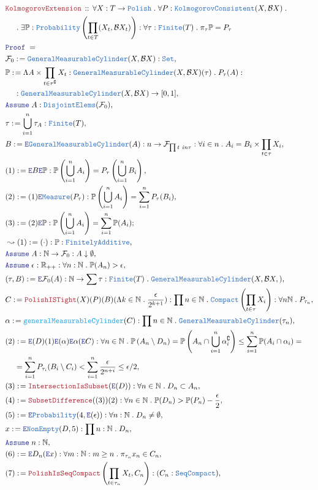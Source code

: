 \documentclass[12pt]{scrartcl}
\newcommand{\TYPE}[1]{\textcolor{NavyBlue}{\mathtt{#1}}}
\newcommand{\FUNC}[1]{\textcolor{Cerulean}{\mathtt{#1}}}
\newcommand{\LOGIC}[1]{\textcolor{Blue}{\mathtt{#1}}}
\newcommand{\THM}[1]{\textcolor{Maroon}{\mathtt{#1}}}
\renewcommand{\.}{\; . \;}
\newcommand{\de}{: \kern 0.1pc =}
\newcommand{\Theorem}[2]{& \THM{#1} \, :: \, #2 \\ & \Proof = \\ }
\newcommand{\NewLine}{\\ & \kern 1pc}
\newcommand{\Page}[1]{ \begin{align*} #1 \end{align*}   }
\newcommand{\ForEach}[3]{\forall #1 : #2 \. #3 }
\newcommand{\Reals}{\mathbb{R} }
\newcommand{\Nat}{\mathbb{N} }
\newcommand{\Set}{\TYPE{Set}}
\renewcommand{\c}{\complement}
\newcommand{\Say}[3]{& #1 \de #2 : #3, \\}
\newcommand{\Conclude}[3]{& #1 \de #2 : #3; \\}
\newcommand{\Derive}[3]{& \leadsto #1 \de #2 : #3, \\}
\newcommand{\Assume}[2]{& \LOGIC{Assume} \; #1 : #2, \\}
\newcommand{\ByDef}{\LOGIC{E}}
\newcommand{\Proof}{\LOGIC{Proof} \; }
\newcommand{\B}{\mathcal{B}}
\newcommand{\F}{\mathcal{F}}
\begin{document}
\Page{
\Theorem{ KolmogorovExtension }{ 
\ForEach{X}{T \to \TYPE{Polish}}{
\ForEach{P}{ \TYPE{KolmogorovConsistent}(X, \B X ) }{ \NewLine \. 
\exists \mathbb{P} :\TYPE{Probability}\left( \prod_{ t \in T}  (X_t, \B X_t)  \right)
 : 
\ForEach{\tau}{\TYPE{Finite}(T)}{ 
 \pi_\tau \mathbb{P} = P_\tau
}}}}
\Say{ \F_0 }{  \TYPE{GeneralMeasurableCylinder}(X, \B X)  }{\Set}
\Say{ \mathbb{P}}{ \Lambda A \times \prod_{t \in \tau^\c } X_t : \TYPE{GeneralMeasurableCylinder}(X, \B X)(\tau) \. P_\tau(A)  }{ \NewLine :
\TYPE{ GeneralMeasurableCylinder}(X, \B X) \to [0,1] }
\Assume{A}{\TYPE{DisjointElems}(\F_0)}
\Say{\tau}{ \bigcup^n_{i = 1} \tau_A }{ \TYPE{Finite}(T) }
\Say{ B }{ \ByDef\TYPE{GeneralMeasurableCylinder}(A) }{ n \to \F_{\prod t \ in \tau} : \forall i \in n \. A_i = B_i \times \prod_{t \in \tau} X_i }
\Say{  (1)  }{  \ByDef B \ByDef \mathbb{P}}{  \mathbb{P} \left(  \bigcup^n_{i = 1} A_i  \right) 
 = P_\tau \left(  \bigcup^n_{i = 1} B_i \right) }
\Say{ (2)  }{ (1)\ByDef\TYPE{Measure}( P_\tau)   }{ \mathbb{P} \left( \bigcup^n_{i = 1} A_i \right) =  \sum^n_{i = 1} P_\tau ( B_i ) }
\Conclude{ (3) }{ (2)\ByDef \mathbb{P} }{  \mathbb{P} \left( \bigcup^n_{i = 1} A_i \right) = \sum^n_{i = 1} \mathbb{P}(A_i) }
\Derive{  (1)   }{  (\cdot)    }{  \mathbb{P} : \TYPE{FinitelyAdditive}  }
\Assume{ A  }{ \Nat \to \F_0 : A \downarrow \emptyset }
\Assume{ \epsilon }{ \Reals_{++}  : \forall n : \Nat \. \mathbb{P}(A_n) > \epsilon }
\Say{ ( \tau, B ) }{ \ByDef \F_0 (A) }{ \Nat \to \sum \tau : \TYPE{ Finite  }(T) \. \TYPE{GeneralMeasurableCylinder}(X, \B X, )   }
\Say{   C    }{ \THM{PolishISTight}(X)(P)(B)(\Lambda k \in \Nat \. \frac{\epsilon}{2^{k +1}}) }{ \prod n \in \Nat \. \TYPE{Compact}\left( \prod_{t \in \tau} X_i \right)
 : \forall n \Nat \. P_{\tau_n} }
\Say{ \alpha  }{ \FUNC{ generalMeasurableCylinder}( C  ) }{ \prod n \in \Nat \. \TYPE{GeneralMeasurableCylinder}( \tau_n  ) }
\Say{ (2)  }{ \ByDef( D )(1)\ByDef( \alpha )\ByDef{\alpha}(\ByDef C  )  }{
 \forall n \in \Nat \. \mathbb{P} \left(  A_n \setminus D_n  \right)     
 =  \mathbb{P} \left(   A_n \cap \bigcup^n_{ i = 1  } \alpha_i^\c \right)  
 \le \sum^n_{i = 1} \mathbb{P}( A_i  \cap  \alpha_i ) = \NewLine =
\sum^n_{i = 1} P_{ \tau_i}( B_i \setminus C_i  ) <
\sum^n_{i = 1} \frac{ \epsilon }{2^{n + i }} 
\le \epsilon/2 }
\Say{ (3) }{ \THM{IntersectionIsSubset}(\ByDef(D)) }{ \forall n \in \Nat \. D_n \subset A_n  }
\Say{ (4) }{ \THM{SubsetDifference}((3))(2) }{ \forall n \in \Nat \. \mathbb{P}(D_n) > \mathbb{P}(P_n) - \frac{\epsilon}{ 2 }}
\Say{ (5) }{ \ByDef\TYPE{Probability}(4,\ByDef(\epsilon) ) }{  \forall n :  \Nat \. D_n \neq \emptyset  }
\Say{ x }{ \ByDef\TYPE{NonEmpty}(D,5) }{ \prod n : \Nat \. D_n}
\Assume{n}{\Nat}
\Say{(6)}{ \ByDef D_n(  \ByDef x) }{ \forall m : \Nat : m \ge n \. \pi_{\tau_n} x_n \in C_n}
\Say{(7)}{ \THM{PolishIsSeqCompact}\left( \prod_{t \in \tau_n} X_t, C_n \right) }{ ( C_n : \TYPE{SeqCompact}) }
}
\end{document}
